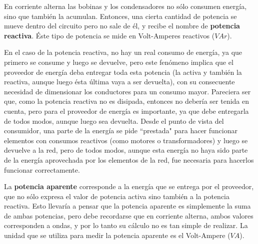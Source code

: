 En corriente alterna las bobinas y los condensadores no sólo consumen energía, sino que también la acumulan. Entonces, una cierta cantidad de potencia se mueve dentro del circuito pero no sale de él, y recibe el nombre de \textbf{potencia reactiva}. Éste tipo de potencia se mide en Volt-Amperes reactivos ($VAr$).

En el caso de la potencia reactiva, no hay un real consumo de energía, ya que primero se consume y luego se devuelve, pero este fenómeno implica que el proveedor de energía deba entregar toda esta potencia (la activa y también la reactiva, aunque luego ésta última vaya a ser devuelta), con su consecuente necesidad de dimensionar los conductores para un consumo mayor. Pareciera ser que, como la potencia reactiva no es disipada, entonces no  debería ser tenida en cuenta, pero para el proveedor de energía es importante, ya que debe entregarla de todos modos, aunque luego sea devuelta. Desde el punto de vista del consumidor, una parte de la energía se pide ``prestada" para hacer funcionar elementos con consumos reactivos (como motores o transformadores) y luego se devuelve a la red, pero de todos modos, aunque esta energía no haya sido parte de la energía aprovechada por los elementos de la red, fue necesaria para hacerlos funcionar correctamente.

La \textbf{potencia aparente} corresponde a la energía que se entrega por el proveedor, que no sólo expresa el valor de potencia activa sino también a la potencia reactiva. Esto llevaría a pensar que la potencia aparente es simplemente la suma de ambas potencias, pero debe recordarse que en corriente alterna, ambos valores corresponden a ondas, y por lo tanto su cálculo no es tan simple de realizar. La unidad que se utiliza para medir la potencia aparente es el Volt-Ampere ($VA$).

